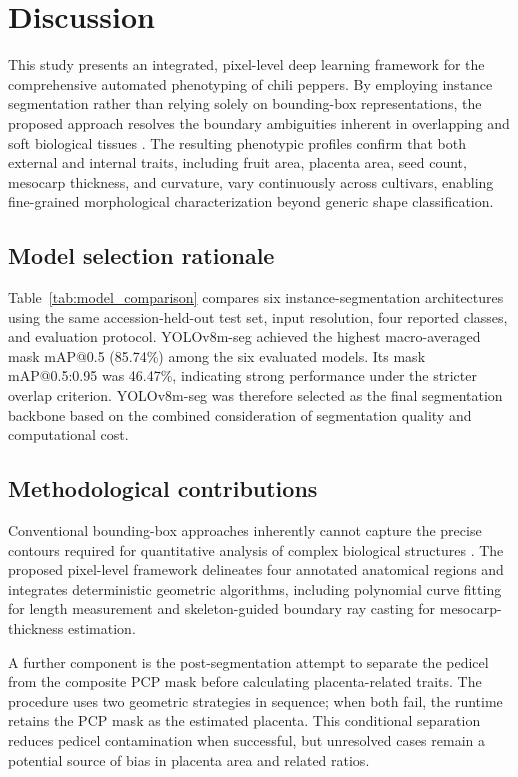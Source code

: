 \documentclass[final,5p,times,twocolumn]{elsarticle}
\begin{document}
\section{Discussion}

This study presents an integrated, pixel-level deep learning framework for the comprehensive automated phenotyping of chili peppers. By employing instance segmentation rather than relying solely on bounding-box representations, the proposed approach resolves the boundary ambiguities inherent in overlapping and soft biological tissues \cite{robotic,instance}. The resulting phenotypic profiles confirm that both external and internal traits, including fruit area, placenta area, seed count, mesocarp thickness, and curvature, vary continuously across cultivars, enabling fine-grained morphological characterization beyond generic shape classification.

\subsection*{Model selection rationale}
Table~\ref{tab:model_comparison} compares six instance-segmentation architectures using the same accession-held-out test set, input resolution, four reported classes, and evaluation protocol. YOLOv8m-seg achieved the highest macro-averaged mask mAP@0.5 (85.74\%) among the six evaluated models. Its mask mAP@0.5:0.95 was 46.47\%, indicating strong performance under the stricter overlap criterion. YOLOv8m-seg was therefore selected as the final segmentation backbone based on the combined consideration of segmentation quality and computational cost.

\subsection*{Methodological contributions}
Conventional bounding-box approaches inherently cannot capture the precise contours required for quantitative analysis of complex biological structures \cite{instance,gedil}. The proposed pixel-level framework delineates four annotated anatomical regions and integrates deterministic geometric algorithms, including polynomial curve fitting for length measurement and skeleton-guided boundary ray casting for mesocarp-thickness estimation.

A further component is the post-segmentation attempt to separate the pedicel from the composite PCP mask before calculating placenta-related traits. The procedure uses two geometric strategies in sequence; when both fail, the runtime retains the PCP mask as the estimated placenta. This conditional separation reduces pedicel contamination when successful, but unresolved cases remain a potential source of bias in placenta area and related ratios.
\end{document}
